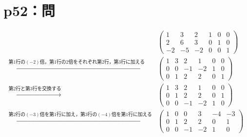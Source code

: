 \documentclass[a4paper,10pt,fleqn]{ltjsarticle}
\begin{document}
\newpage

\section*{p52：問}

\begin{tleftbar}
  \begin{align*}
                                                                        &
    \left(
    \begin{array}{ccc|ccc}
        1  & 3  & 2  & 1 & 0 & 0 \\
        2  & 6  & 3  & 0 & 1 & 0 \\
        -2 & -5 & -2 & 0 & 0 & 1
      \end{array}
    \right)                                                               \\
    \xrightarrow{\text{第$1$行の$(-2)$倍，第$1$行の$2$倍をそれぞれ第$2$行，第$3$行に加える}}   &
    \left( \begin{array}{ccc|ccc}
               1 & 3 & 2  & 1  & 0 & 0 \\
               0 & 0 & -1 & -2 & 1 & 0 \\
               0 & 1 & 2  & 2  & 0 & 1
             \end{array}
    \right)                                                               \\
    \xrightarrow{\text{第$2$行と第$3$行を交換する}}                               &
    \left( \begin{array}{ccc|ccc}
               1 & 3 & 2  & 1  & 0 & 0 \\
               0 & 1 & 2  & 2  & 0 & 1 \\
               0 & 0 & -1 & -2 & 1 & 0
             \end{array}
    \right)                                                               \\
    \xrightarrow{\text{第$2$行の$(-3)$倍を第$1$行に加え，第$3$行の$(-4)$倍を第$1$行に加える}} &
    \left( \begin{array}{ccc|ccc}
               1 & 0 & 0  & 3  & -4 & -3 \\
               0 & 1 & 2  & 2  & 0  & 1  \\
               0 & 0 & -1 & -2 & 1  & 0
             \end{array}
    \right)                                                               \\

\end{align*}
\end{tleftbar}
\end{document}
